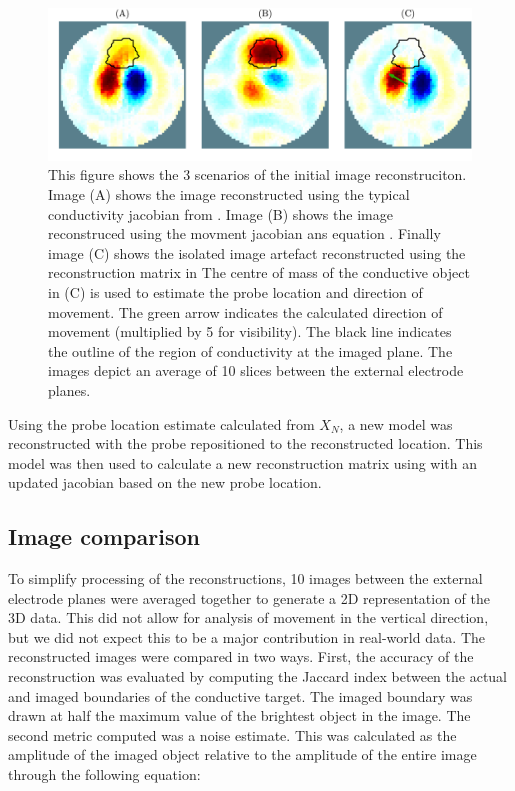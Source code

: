 \begin{figure}
    \centering
   \includegraphics[width=\textwidth]{chapter7-internal_elec_motion/imgs/recon_methods.pdf} 
   \caption[Motion correction methods]{\label{fig:motion_correction_methods} 
   This figure shows the 3 scenarios of the initial image reconstruciton. 
   Image (A) shows the image reconstructed using the typical conductivity jacobian 
   from . Image (B) shows the image reconstruced using the movment 
   jacobian ans equation . Finally image (C) shows the 
   isolated image artefact reconstructed using the reconstruction matrix in 
	The centre of mass of the conductive object in (C) is used to
	estimate the probe location and direction of movement. The green arrow indicates the 
	calculated direction of movement (multiplied by 5 for visibility).
	The black line indicates the outline of the region of conductivity at the imaged plane.
	The images depict an average of 10 slices between the external electrode planes.}
\end{figure}

Using the probe location estimate calculated from $X_N$,
a new model was reconstructed with the probe repositioned 
to the reconstructed location. 
This model was then used to calculate a new reconstruction matrix 
using 
with an updated jacobian based on the new probe location. 


\subsection{Image comparison}
To simplify processing of the reconstructions, 10 images between the 
external electrode planes were averaged together to generate a 2D 
representation of the 3D data. This did not allow for analysis of movement in the vertical 
direction, but we did not expect this to be a major contribution in real-world data.
The reconstructed images were compared in two ways. First, the accuracy of the reconstruction
was evaluated by computing the Jaccard index \parencite{jaccard_distribution_1912} 
between the actual and imaged boundaries of the 
conductive target. The imaged boundary was drawn at half the maximum value of the brightest 
object in the image. The second metric computed was a noise estimate. This was calculated as
the amplitude of the imaged object relative to the amplitude of the entire image through the
following equation:

